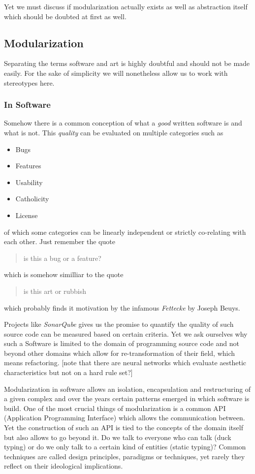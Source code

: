 \documentclass[10pt,twocolumn,letterpaper]{article}
\begin{document}
Yet we must discuss if modularization actually exists as well as abstraction itself which should be doubted at first as well.

\subsection{Modularization}

Separating the terms software and art is highly doubtful and should not be made easily.
For the sake of simplicity we will nonetheless allow us to work with stereotypes here.

\subsubsection*{In Software}

Somehow there is a common conception of what a \textit{good} written software is and what is not.
This \textit{quality} can be evaluated on multiple categories such as

\begin{itemize}
    \item Bugs
    \item Features
    \item Usability
    \item Catholicity
    \item License
\end{itemize}

of which some categories can be linearly independent or strictly co-relating with each other.
Just remember the quote \begin{quote}
    is this a bug or a feature?
\end{quote}
which is somehow similliar to the quote \begin{quote}
    is this art or rubbish
\end{quote}
which probably finds it motivation by the infamous \textit{Fettecke} by Joseph Beuys.

Projects like \textit{SonarQube} gives us the promise to quantify the quality of such source code can be measured based on certain criteria.
Yet we ask ourselves why such a Software is limited to the domain of programming source code and not beyond other domains which allow for re-transformation of their field, which means refactoring.
[note that there are neural networks which evaluate aesthetic characteristics but not on a hard rule set?]

Modularization in software allows an isolation, encapsulation and restructuring of a given complex and over the years certain patterns emerged in which software is build.
One of the most crucial things of modularization is a common API (Application Programming Interface) which allows the communication between.
Yet the construction of such an API is tied to the concepts of the domain itself but also allows to go beyond it.
Do we talk to everyone who can talk (duck typing) or do we only talk to a certain kind of entities (static typing)?
Common techniques are called design principles, paradigms or techniques, yet rarely they reflect on their ideological implications.
\end{document}
